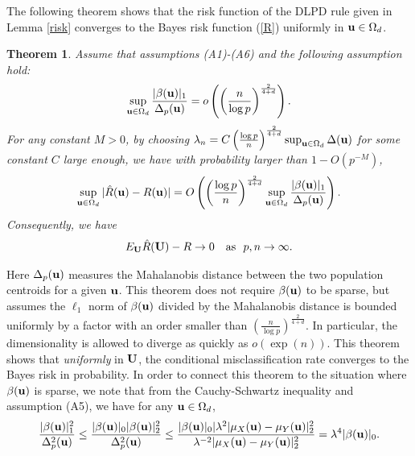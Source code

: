 \documentclass[11pt]{article}
\newtheorem{thm}{Theorem}%
\theoremstyle{definition}
\begin{document}
 
 
 The following theorem shows that the risk function of the DLPD rule given
 in Lemma \ref{risk} converges to the Bayes risk function (\ref{R}) uniformly
 in ${\bf u}\in\Omega_d$.
 
 
 
 \begin{thm}\label{theorem1}
 	Assume that assumptions (A1)-(A6)
 	and the following assumption hold:
 	\begin{eqnarray}\label{assump0}
 		\sup_{{\bf u}\in \Omega_d}\frac{ |\beta({\bf u})|_1}{\Delta_p({\bf u})}=o\left(\left(\frac{n}{\log p}\right)^{\frac{2}{4+d}}\right).
 	\end{eqnarray}
 	For any constant $M>0$, by choosing %
 	$\lambda_n=C\left(\frac{\log p}{n}\right)^{\frac{2}{4+d}}\sup_{{\bf u}\in \Omega_d}\Delta({\bf u})$ for some constant $C$
 	large enough, we have with probability larger than $1-{O}(p^{-M})$,
 	\begin{eqnarray*}
 		\sup_{{\bf u}\in \Omega_d}|\hat{R}({\bf u})-R({\bf u})|=O\left( \left(\frac{\log p}{n}\right)^{\frac{2}{4+d}}\sup_{{\bf u}\in \Omega_d}\frac{|\beta({\bf u})|_1}{\Delta_p({\bf u})}\right).
 	\end{eqnarray*}
 	Consequently, we have
 	\begin{eqnarray*}
 		E_{\bf U}\hat{R}({\bf U})-R\rightarrow 0  ~~~{\rm as} ~~p, n\rightarrow \infty.
 	\end{eqnarray*}
 \end{thm}
 Here $\Delta_p({\bf u})$ measures the Mahalanobis distance between the
 two population centroids for a given ${\bf u}$. This theorem does not require $\beta({\bf u})$ to be
 sparse, but assumes the $\ell_1$ norm of $\beta({\bf u})$ divided by the
 Mahalanobis distance
 is bounded uniformly by a
 factor with an order smaller than $ \left(\frac{n}{\log p}\right)^{\frac{2}{4+d}}$. In
 particular, the dimensionality is allowed to diverge as quickly as
 $o(\exp(n))$. This theorem shows that {\it uniformly} in ${\bf U}$,
 the conditional misclassification rate converges to the Bayes risk in
 probability. In order
 to connect this theorem to the situation where $\beta({\bf u})$ is sparse, we note
 that from the Cauchy-Schwartz inequality and assumption (A5), we have for any ${\bf u}\in \Omega_d$,
 \begin{eqnarray*}
 	\frac{|\beta({\bf u})|_1^2}{\Delta_p^2({\bf u})}\leq
 	\frac{|\beta({\bf u})|_0|\beta({\bf u})|_2^2}{\Delta_p^2({\bf u})}\leq
 	\frac{|\beta({\bf u})|_0|\lambda^2|\mu_X({\bf u})-\mu_Y({\bf u})|_2^2}{\lambda^{-2}|\mu_X({\bf u})-\mu_Y({\bf u})|_2^2}=\lambda^4|\beta({\bf u})|_0.
 \end{eqnarray*}
\end{document}
